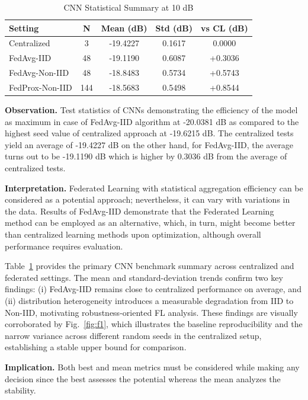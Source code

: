 \documentclass[runningheads]{llncs}
\begin{document}
\begin{table}[htbp]
\caption{CNN Statistical Summary at 10 dB}
\label{tab:cnn_stats}
\centering
\begin{tabular}{lcccc}
\toprule
Setting & N & Mean (dB) & Std (dB) & vs CL (dB) \\
\midrule
Centralized & 3 & -19.4227 & 0.1617 & 0.0000 \\
FedAvg-IID & 48 & -19.1190 & 0.6087 & +0.3036 \\
FedAvg-Non-IID & 48 & -18.8483 & 0.5734 & +0.5743 \\
FedProx-Non-IID & 144 & -18.5683 & 0.5498 & +0.8544 \\
\bottomrule
\end{tabular}
\end{table}

\noindent\textbf{Observation.} Test statistics of CNNs demonstrating the efficiency of the model as maximum in case of FedAvg-IID algorithm at -20.0381 dB as compared to the highest seed value of centralized approach at -19.6215 dB. The centralized tests yield an average of -19.4227 dB on the other hand, for FedAvg-IID, the average turns out to be -19.1190 dB which is higher by 0.3036 dB from the average of centralized tests.

\noindent\textbf{Interpretation.} Federated Learning with statistical aggregation efficiency can be considered as a potential approach; nevertheless, it can vary with variations in the data. Results of FedAvg-IID demonstrate that the Federated Learning method can be employed as an alternative, which, in turn, might become better than centralized learning methods upon optimization, although overall performance requires evaluation.

Table~\ref{tab:cnn_stats} provides the primary CNN benchmark summary across centralized and federated settings. The mean and standard-deviation trends confirm two key findings: (i) FedAvg-IID remains close to centralized performance on average, and (ii) distribution heterogeneity introduces a measurable degradation from IID to Non-IID, motivating robustness-oriented FL analysis. These findings are visually corroborated by Fig.~\ref{fig:f1}, which illustrates the baseline reproducibility and the narrow variance across different random seeds in the centralized setup, establishing a stable upper bound for comparison.

\noindent\textbf{Implication.} Both best and mean metrics must be considered while making any decision since the best assesses the potential whereas the mean analyzes the stability.
\end{document}
